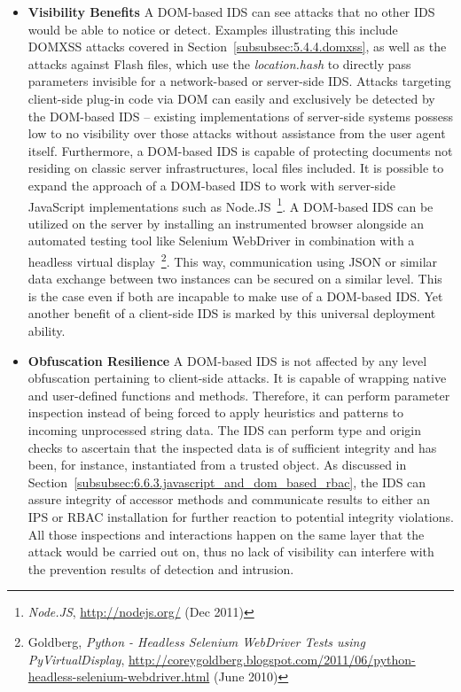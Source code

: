       \begin{itemize}
	\item \textbf{Visibility Benefits} A DOM-based IDS can see attacks that no other IDS would be able to notice or detect. Examples illustrating this include DOMXSS attacks covered in Section~\ref{subsubsec:5.4.4.domxss}, as well as the attacks against Flash files, which use the \textit{location.hash} to directly pass parameters invisible for a network-based or server-side IDS. Attacks targeting client-side plug-in code via DOM can easily and exclusively be detected by the DOM-based IDS -- existing implementations of server-side systems possess low to no visibility over those attacks without assistance from the user agent itself. Furthermore, a DOM-based IDS is capable of protecting documents not residing on classic server infrastructures, local files included. It is possible to expand the approach of a DOM-based IDS to work with server-side JavaScript implementations such as Node.JS~\footnote{\textit{Node.JS}, \url{http://nodejs.org/} (Dec 2011)}. A DOM-based IDS can be utilized on the server by installing an instrumented browser alongside an automated testing tool like Selenium WebDriver in combination with a headless virtual display~\footnote{Goldberg, \textit{Python - Headless Selenium WebDriver Tests using PyVirtualDisplay}, \url{http://coreygoldberg.blogspot.com/2011/06/python-headless-selenium-webdriver.html} (June 2010)}. This way, communication using JSON or similar data exchange between two instances can be secured on a similar level. This is the case even if both are incapable to make use of a DOM-based IDS. Yet another benefit of a client-side IDS is marked by this universal deployment ability.
	\item \textbf{Obfuscation Resilience} A DOM-based IDS is not affected by any level obfuscation pertaining to client-side attacks. It is capable of wrapping native and user-defined functions and methods. Therefore, it can perform parameter inspection instead of being forced to apply heuristics and patterns to incoming unprocessed string data. The IDS can perform type and origin checks to ascertain that the inspected data is of sufficient integrity and has been, for instance, instantiated from a trusted object. As discussed in Section~\ref{subsubsec:6.6.3.javascript_and_dom_based_rbac}, the IDS can assure integrity of accessor methods and communicate results to either an IPS or RBAC installation for further reaction to potential integrity violations. All those inspections and interactions happen on the same layer that the attack would be carried out on, thus no lack of visibility can interfere with the prevention results of detection and intrusion. 

\end{itemize}
